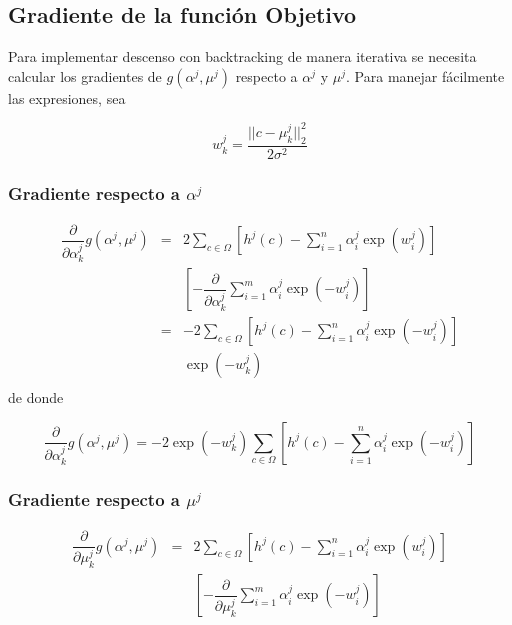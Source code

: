 \documentclass[11pt,letterpaper]{article}
\theoremstyle{definition}
\theoremstyle{definition}
\theoremstyle{definition}
\begin{document}
\subsection{Gradiente de la función Objetivo}
Para implementar descenso con backtracking de manera iterativa se necesita calcular los gradientes de $ g(\alpha^j, \mu^j) $ respecto a $ \alpha^j $ y $ \mu^j $. Para manejar fácilmente las expresiones, sea
\begin{shaded*}
	\begin{equation*}
		w_k^j = \dfrac{|| c - \mu_k^j ||^2_2}{2 \sigma^2}
	\end{equation*}
\end{shaded*} 
\subsubsection{Gradiente respecto a $ \alpha^j $}
\footnotesize{
\begin{eqnarray*}
	\dfrac{\partial }{\partial \alpha_k^j} g(\alpha^j, \mu^j) 
	& = &
	2 \sum_{c\in \Omega} \left[ h^j (c) - \sum_{i = 1}^n \alpha_i^j \exp(w_i^j) \right] \\
	&   & \left[ - \dfrac{\partial }{\partial \alpha_k^j}
					\sum_{i = 1}^m \alpha_i^j \exp(-w_i^j) \right] \\
	& = &
	- 2 \sum_{c\in \Omega} \left[ h^j (c) - \sum_{i = 1}^n \alpha_i^j \exp(-w_i^j) \right]\\
	&   & \exp(-w_k^j)\\
\end{eqnarray*}
}
\normalsize{de donde}
\begin{shaded*}
	\footnotesize {\begin{equation}
		\dfrac{\partial }{\partial \alpha_k^j} g(\alpha^j, \mu^j) =
		- 2 \exp(-w_k^j) \sum_{c\in \Omega} \left[ h^j (c) - \sum_{i = 1}^n \alpha_i^j \exp(-w_i^j) \right]
	\end{equation}}
\end{shaded*}
\subsubsection{Gradiente respecto a $ \mu^j $}
\footnotesize{
	\begin{eqnarray*}
		\dfrac{\partial }{\partial \mu_k^j} g(\alpha^j, \mu^j) 
		& = &
		2 \sum_{c\in \Omega} \left[ h^j (c) - \sum_{i = 1}^n \alpha_i^j \exp(w_i^j) \right] \\
		&   & \left[ - \dfrac{\partial }{\partial \mu_k^j}
		\sum_{i = 1}^m \alpha_i^j \exp(-w_i^j) \right]
	\end{eqnarray*}
}
\end{document}
